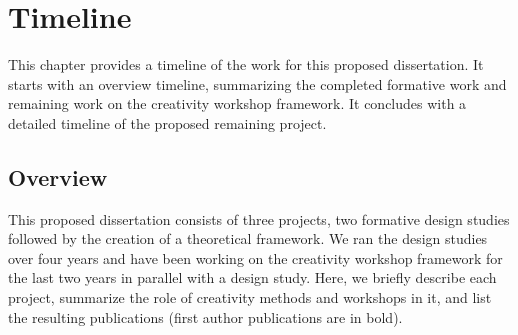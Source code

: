 \chapter{Timeline}
\label{ch:conclusion}

This chapter provides a timeline of the work for this proposed dissertation. It starts with an overview timeline, summarizing the completed formative work and remaining work on the creativity workshop framework. It concludes with a detailed timeline of the proposed remaining project.

\section{Overview}

This proposed dissertation consists of three projects, two formative design studies followed by the creation of a theoretical framework. We ran the design studies over four years and have been working on the creativity workshop framework for the last two years in parallel with a design study. Here, we briefly describe each project, summarize the role of creativity methods and workshops in it, and list the resulting publications (first author publications are in bold).

